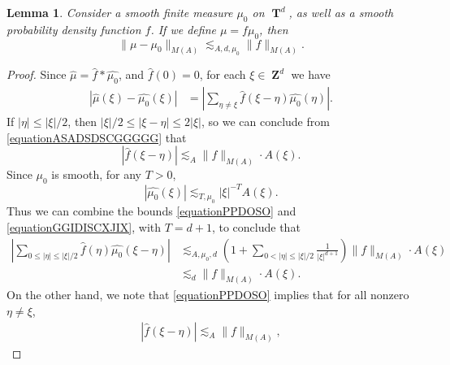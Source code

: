 \documentclass[12pt,reqno]{article}
\numberwithin{equation}{section}
\DeclareMathOperator{\ZZ}{\mathbf{Z}}
\DeclareMathOperator{\TT}{\mathbf{T}}
\newtheorem{lemma}[theorem]{Lemma}
\begin{document}
\begin{lemma}
    Consider a smooth finite measure $\mu_0$ on $\TT^d$, as well as a smooth probability density function $f$. If we define $\mu = f \mu_0$, then
    \[ \| \mu - \mu_0 \|_{M(A)} \lesssim_{A,d,\mu_0} \| f \|_{M(A)}. \]
\end{lemma}
\begin{proof}
    Since $\widehat{\mu} = \widehat{f} * \widehat{\mu_0}$, and $\widehat{f}(0) = 0$, for each $\xi \in \ZZ^d$ we have
    \begin{equation} \label{equationPPYTUECUUCS}
    \begin{split}
        |\widehat{\mu}(\xi) - \widehat{\mu_0}(\xi)| &= \left| \sum_{\eta \neq \xi} \widehat{f}(\xi - \eta) \widehat{\mu_0}(\eta) \right|.
    \end{split}
    \end{equation}
    If $|\eta| \leq |\xi|/2$, then $|\xi|/2 \leq |\xi - \eta| \leq 2 |\xi|$, so we can conclude from \eqref{equationASADSDSCGGGGG} that
    \begin{equation} \label{equationPPDOSO}
        |\widehat{f}(\xi - \eta)| \lesssim_A \| f \|_{M(A)} \cdot A(\xi).
    \end{equation}
    Since $\mu_0$ is smooth, for any $T > 0$,
    \begin{equation} \label{equationGGIDISCXJIX}
        |\widehat{\mu_0}(\xi)| \lesssim_{T,\mu_0} |\xi|^{-T} A(\xi).
    \end{equation}
    Thus we can combine the bounds \eqref{equationPPDOSO} and \eqref{equationGGIDISCXJIX}, with $T = d+1$, to conclude that
    \begin{equation} \label{equationGGPSOVVCSI}
    \begin{split}
        \left| \sum_{0 \leq |\eta| \leq |\xi|/2} \widehat{f}(\eta) \widehat{\mu_0}(\xi - \eta) \right| &\lesssim_{A,\mu_0,d} \left( 1 + \sum_{0 < |\eta| \leq |\xi|/2} \frac{1}{|\xi|^{d+1}} \right) \| f \|_{M(A)} \cdot A(\xi)\\
        &\lesssim_d \| f \|_{M(A)} \cdot A(\xi).
    \end{split}
    \end{equation}
    On the other hand, we note that \eqref{equationPPDOSO} implies that for all nonzero $\eta \neq \xi$,
    \begin{equation} \label{equationGGDPSOX}
    \begin{split}
        |\widehat{f}(\xi - \eta)| \lesssim_A \| f \|_{M(A)},
    \end{split}

\end{equation}
\end{proof}
\end{document}
